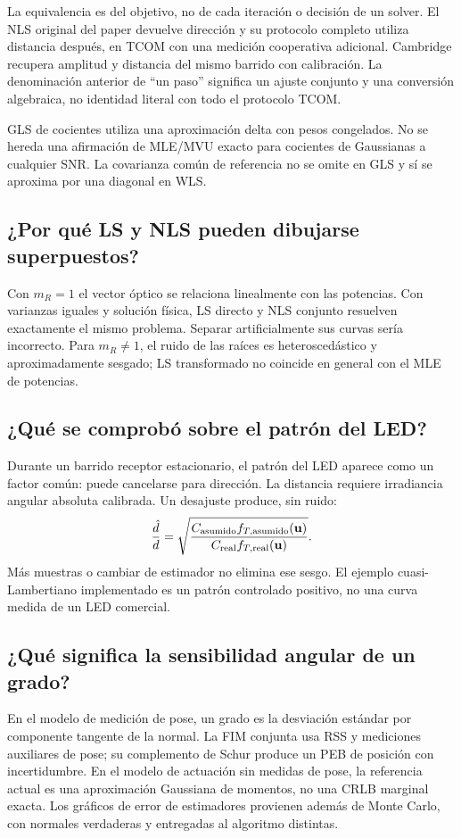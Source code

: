 \documentclass[11pt,a4paper]{article}
\begin{document}
La equivalencia es del objetivo, no de cada iteración o decisión de un solver. El NLS original del paper devuelve dirección y su protocolo completo utiliza distancia después, en TCOM con una medición cooperativa adicional. Cambridge recupera amplitud y distancia del mismo barrido con calibración. La denominación anterior de ``un paso'' significa un ajuste conjunto y una conversión algebraica, no identidad literal con todo el protocolo TCOM.

GLS de cocientes utiliza una aproximación delta con pesos congelados. No se hereda una afirmación de MLE/MVU exacto para cocientes de Gaussianas a cualquier SNR. La covarianza común de referencia no se omite en GLS y sí se aproxima por una diagonal en WLS.

\subsection{¿Por qué LS y NLS pueden dibujarse superpuestos?}
Con $m_R=1$ el vector óptico se relaciona linealmente con las potencias. Con varianzas iguales y solución física, LS directo y NLS conjunto resuelven exactamente el mismo problema. Separar artificialmente sus curvas sería incorrecto. Para $m_R\ne1$, el ruido de las raíces es heteroscedástico y aproximadamente sesgado; LS transformado no coincide en general con el MLE de potencias.

\subsection{¿Qué se comprobó sobre el patrón del LED?}
Durante un barrido receptor estacionario, el patrón del LED aparece como un factor común: puede cancelarse para dirección. La distancia requiere irradiancia angular absoluta calibrada. Un desajuste produce, sin ruido:
\begin{equation}
 \frac{\hat d}{d}=\sqrt{\frac{C_{\rm asumido}f_{T,\rm asumido}(\mathbf u)}{C_{\rm real}f_{T,\rm real}(\mathbf u)}}.
\end{equation}
Más muestras o cambiar de estimador no elimina ese sesgo. El ejemplo cuasi-Lambertiano implementado es un patrón controlado positivo, no una curva medida de un LED comercial.

\subsection{¿Qué significa la sensibilidad angular de un grado?}
En el modelo de medición de pose, un grado es la desviación estándar por componente tangente de la normal. La FIM conjunta usa RSS y mediciones auxiliares de pose; su complemento de Schur produce un PEB de posición con incertidumbre. En el modelo de actuación sin medidas de pose, la referencia actual es una aproximación Gaussiana de momentos, no una CRLB marginal exacta. Los gráficos de error de estimadores provienen además de Monte Carlo, con normales verdaderas y entregadas al algoritmo distintas.
\end{document}
